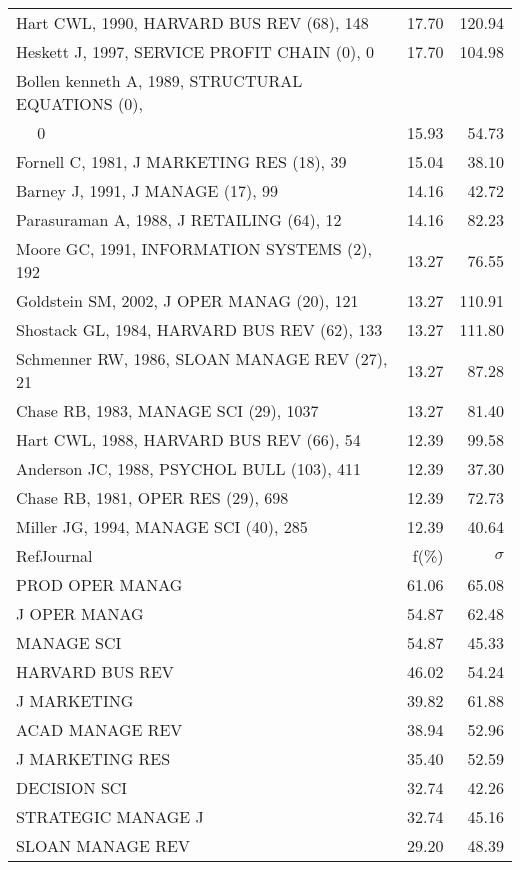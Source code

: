 \documentclass[a4paper,11pt]{report}
\begin{document}
\begin{landscape}
\begin{table}[!ht]
{\begin{tabular}{|l r r|}
Hart CWL, 1990, HARVARD BUS REV (68), 148 & 17.70 & 120.94\\
Heskett J, 1997, SERVICE PROFIT CHAIN (0), 0 & 17.70 & 104.98\\
Bollen kenneth A, 1989, STRUCTURAL EQUATIONS (0), &  & \\
$\quad$ 0 & 15.93 & 54.73\\
Fornell C, 1981, J MARKETING RES (18), 39 & 15.04 & 38.10\\
Barney J, 1991, J MANAGE (17), 99 & 14.16 & 42.72\\
Parasuraman A, 1988, J RETAILING (64), 12 & 14.16 & 82.23\\
Moore GC, 1991, INFORMATION SYSTEMS (2), 192 & 13.27 & 76.55\\
Goldstein SM, 2002, J OPER MANAG (20), 121 & 13.27 & 110.91\\
Shostack GL, 1984, HARVARD BUS REV (62), 133 & 13.27 & 111.80\\
Schmenner RW, 1986, SLOAN MANAGE REV (27), 21 & 13.27 & 87.28\\
Chase RB, 1983, MANAGE SCI (29), 1037 & 13.27 & 81.40\\
Hart CWL, 1988, HARVARD BUS REV (66), 54 & 12.39 & 99.58\\
Anderson JC, 1988, PSYCHOL BULL (103), 411 & 12.39 & 37.30\\
Chase RB, 1981, OPER RES (29), 698 & 12.39 & 72.73\\
Miller JG, 1994, MANAGE SCI (40), 285 & 12.39 & 40.64\\
\hline
\hline
RefJournal & f(\%) & $\sigma$\\
\hline
PROD OPER MANAG & 61.06 & 65.08\\
J OPER MANAG & 54.87 & 62.48\\
MANAGE SCI & 54.87 & 45.33\\
HARVARD BUS REV & 46.02 & 54.24\\
J MARKETING & 39.82 & 61.88\\
ACAD MANAGE REV & 38.94 & 52.96\\
J MARKETING RES & 35.40 & 52.59\\
DECISION SCI & 32.74 & 42.26\\
STRATEGIC MANAGE J & 32.74 & 45.16\\
SLOAN MANAGE REV & 29.20 & 48.39\\
\hline
\end{tabular}
}
\end{table}

\clearpage


\end{landscape}
\end{document}
